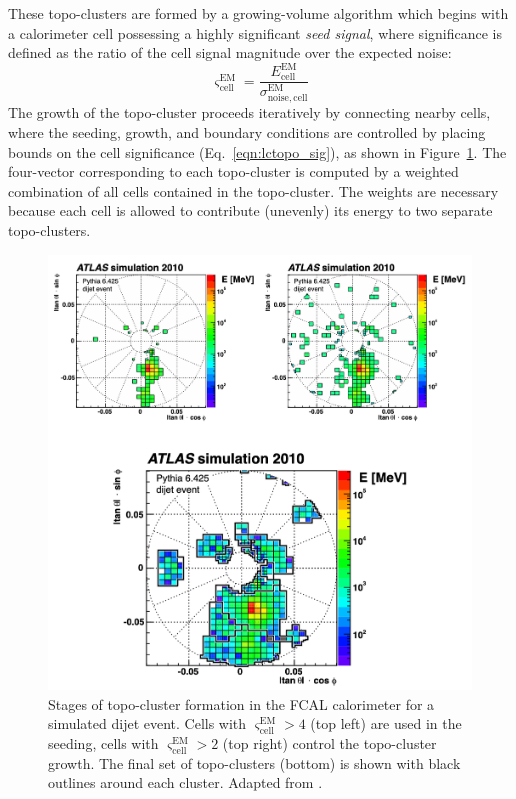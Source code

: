 \newcommand{\LCTopoSig}{\ensuremath{\varsigma^{\mathrm{EM}}_{\mathrm{cell}}}}
These topo-clusters are formed by a growing-volume algorithm \cite{Aad:2016upy} which begins with a calorimeter cell possessing a highly significant \textit{seed signal}, where significance is defined as the ratio of the cell signal magnitude over the expected noise:
\begin{equation}
    \LCTopoSig = \frac{E^{\mathrm{EM}}_{\mathrm{cell}}}{\sigma^{\mathrm{EM}}_{\mathrm{noise,cell}}}
    \label{eqn:lctopo_sig}
\end{equation}
The growth of the topo-cluster proceeds iteratively by connecting nearby cells, where the seeding, growth, and boundary conditions are controlled by placing bounds on the cell significance (Eq.~\ref{eqn:lctopo_sig}), as shown in Figure~\ref{fig:lctopo_formation}.
The four-vector corresponding to each topo-cluster is computed by a weighted combination of all cells contained in the topo-cluster.
The weights are necessary because each cell is allowed to contribute (unevenly) its energy to two separate topo-clusters.

\begin{figure}
	\centering
	\includegraphics[width=\textwidth]{lctopo_formation}
	\caption{
	Stages of topo-cluster formation in the FCAL calorimeter for a simulated dijet event.
	Cells with $\LCTopoSig > 4$ (top left) are used in the seeding, cells with $\LCTopoSig > 2$ (top right) control the topo-cluster growth.
	The final set of topo-clusters (bottom) is shown with black outlines around each cluster.
	Adapted from \cite{Aad:2016upy}.
	}
	\label{fig:lctopo_formation}
\end{figure}


